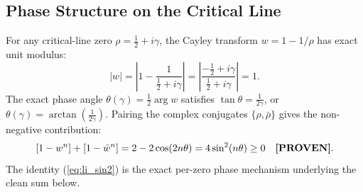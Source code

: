 \documentclass[11pt,a4paper]{article}
\theoremstyle{remark}
\begin{document}
\subsection{Phase Structure on the Critical Line}
For any critical-line zero $\rho = \frac{1}{2} + i\gamma$, the Cayley transform $w = 1 - 1/\rho$ has exact unit modulus:
\[
 |w| = \left|1 - \frac{1}{\frac{1}{2} + i\gamma}\right| = \left|\frac{-\frac{1}{2} + i\gamma}{\frac{1}{2} + i\gamma}\right| = 1.
\]
The exact phase angle $\theta(\gamma) = \frac{1}{2}\arg w$ satisfies $\tan\theta = \frac{1}{2\gamma}$, or $\theta(\gamma) = \arctan\left(\frac{1}{2\gamma}\right)$.
Pairing the complex conjugates $\{\rho, \bar{\rho}\}$ gives the non-negative contribution:
\begin{equation}
 \left[1 - w^n\right] + \left[1 - \bar{w}^n\right] = 2 - 2\cos(2n\theta) = 4\sin^2(n\theta) \ge 0 \quad \text{\textbf{[PROVEN]}}.
 \label{eq:li_sin2}
\end{equation}
The identity (\ref{eq:li_sin2}) is the exact per-zero phase mechanism underlying the clean sum below.
\end{document}
